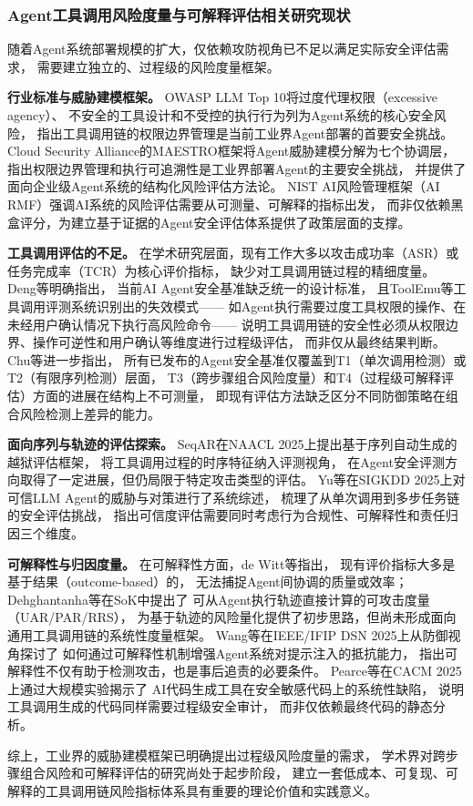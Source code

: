 \subsubsection{Agent工具调用风险度量与可解释评估相关研究现状}

随着Agent系统部署规模的扩大，仅依赖攻防视角已不足以满足实际安全评估需求，
需要建立独立的、过程级的风险度量框架。

\textbf{行业标准与威胁建模框架。}
OWASP LLM Top 10\cite{owasp2025llmtop10}将过度代理权限（excessive agency）、
不安全的工具设计和不受控的执行行为列为Agent系统的核心安全风险，
指出工具调用链的权限边界管理是当前工业界Agent部署的首要安全挑战。
Cloud Security Alliance的MAESTRO框架\cite{huang2025maestro}将Agent威胁建模分解为七个协调层，
指出权限边界管理和执行可追溯性是工业界部署Agent的主要安全挑战，
并提供了面向企业级Agent系统的结构化风险评估方法论。
NIST AI风险管理框架（AI RMF）\cite{nist2023airmf}强调AI系统的风险评估需要从可测量、可解释的指标出发，
而非仅依赖黑盒评分，为建立基于证据的Agent安全评估体系提供了政策层面的支撑。

\textbf{工具调用评估的不足。}
在学术研究层面，现有工作大多以攻击成功率（ASR）或任务完成率（TCR）为核心评价指标，
缺少对工具调用链过程的精细度量。
Deng等\cite{deng2025agentsunderthreat}明确指出，
当前AI Agent安全基准缺乏统一的设计标准，
且ToolEmu等工具调用评测系统识别出的失效模式——
如Agent执行需要过度工具权限的操作、在未经用户确认情况下执行高风险命令——
说明工具调用链的安全性必须从权限边界、操作可逆性和用户确认等维度进行过程级评估，
而非仅从最终结果判断。
Chu等\cite{chu2026systematic}进一步指出，
所有已发布的Agent安全基准仅覆盖到T1（单次调用检测）或T2（有限序列检测）层面，
T3（跨步骤组合风险度量）和T4（过程级可解释评估）方面的进展在结构上不可测量，
即现有评估方法缺乏区分不同防御策略在组合风险检测上差异的能力。

\textbf{面向序列与轨迹的评估探索。}
SeqAR\cite{yang2025seqar}在NAACL 2025上提出基于序列自动生成的越狱评估框架，
将工具调用过程的时序特征纳入评测视角，
在Agent安全评测方向取得了一定进展，但仍局限于特定攻击类型的评估。
Yu等\cite{yu2025survey}在SIGKDD 2025上对可信LLM Agent的威胁与对策进行了系统综述，
梳理了从单次调用到多步任务链的安全评估挑战，
指出可信度评估需要同时考虑行为合规性、可解释性和责任归因三个维度。

\textbf{可解释性与归因度量。}
在可解释性方面，de Witt等\cite{dewitt2026openchallenges}指出，
现有评价指标大多是基于结果（outcome-based）的，
无法捕捉Agent间协调的质量或效率；
Dehghantanha等\cite{dehghantanha2026sokattacksurfaceagentic}在SoK中提出了
可从Agent执行轨迹直接计算的可攻击度量（UAR/PAR/RRS），
为基于轨迹的风险量化提供了初步思路，但尚未形成面向通用工具调用链的系统性度量框架。
Wang等\cite{wang2025protect}在IEEE/IFIP DSN 2025上从防御视角探讨了
如何通过可解释性机制增强Agent系统对提示注入的抵抗能力，
指出可解释性不仅有助于检测攻击，也是事后追责的必要条件。
Pearce等\cite{pearce2025asleep}在CACM 2025上通过大规模实验揭示了
AI代码生成工具在安全敏感代码上的系统性缺陷，
说明工具调用生成的代码同样需要过程级安全审计，
而非仅依赖最终代码的静态分析。

综上，工业界的威胁建模框架已明确提出过程级风险度量的需求，
学术界对跨步骤组合风险和可解释评估的研究尚处于起步阶段，
建立一套低成本、可复现、可解释的工具调用链风险指标体系具有重要的理论价值和实践意义。
